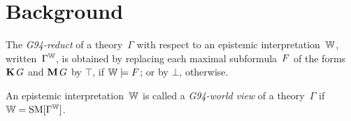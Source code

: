 \section{Background}\label{sec:background}

\begin{definition}[G94-reduct]
    \label{eq:G94-reduct}
    The \emph{G94-reduct} of a theory~$\Gamma$ 
    with respect to an epistemic interpretation~$\mathbb{W}$, written~$\Gamma^{\mathbb{W}}$, is obtained by replacing each maximal subformula~$F$ of the forms $\operatorname{\mathbf{K}} G$ and $\operatorname{\mathbf{M}} G$ by $\top$, if $\mathbb{W} \models F$; or by $\bot$, otherwise.
\end{definition}

\begin{definition}
    \label{def:G94-world.view}
    An epistemic interpretation~$\mathbb{W}$ is called a \emph{G94-world view} of a theory~$\Gamma$
    if~${\mathbb{W} = \text{\rm SM}[\Gamma^{\mathbb{W}} ]}$.
\end{definition}